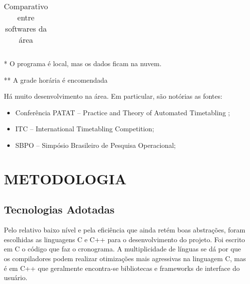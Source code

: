 \documentclass[12pt,a4paper]{article}
\begin{document}
\begin{table}[htb]
\begin{center}
\begin{threeparttable}
{\begin{tabular}{| l | c | c | c | c | c | c | c | c | }
						\end{tabular}
					}
					\caption{Comparativo entre softwares da área}
					\label{table:softwares}
					\footnotesize
					\begin{tablenotes}
						\item[*]{ O programa é local, mas os dados ficam na nuvem.}
						\item[**]{A grade horária é encomendada}
					\end{tablenotes}
				\end{threeparttable}
			\end{center}
		\end{table}

		\vspace{1cm}
		Há muito desenvolvimento na área. Em particular, são notórias as fontes:

		\begin{itemize}
			\item Conferência PATAT -- Practice and Theory of Automated Timetabling ;
			\item ITC -- International Timetabling Competition;
			\item SBPO -- Simpósio Brasileiro de Pesquisa Operacional;
		\end{itemize}

	\clearpage

	\section{METODOLOGIA}

		\subsection{Tecnologias Adotadas}

			\par Pelo relativo baixo nível e pela eficiência que ainda retém boas abstrações, foram escolhidas as linguagens C e C++ para o desenvolvimento do projeto. Foi escrito em C o código que faz o cronograma. A multiplicidade de línguas se dá por que os compiladores podem realizar otimizações mais agressivas na linguagem C, mas é em C++ que geralmente encontra-se bibliotecas e frameworks de interface do usuário.
\end{document}
